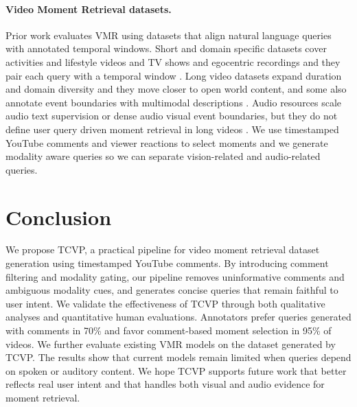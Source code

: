 \documentclass[11pt]{article}
\begin{document}
\paragraph{Video Moment Retrieval datasets.} Prior work evaluates VMR using datasets that align natural language queries with annotated temporal windows. Short and domain specific datasets cover activities and lifestyle videos and TV shows and egocentric recordings and they pair each query with a temporal window \cite{gao2017tall,QVHighlights,lei2020tvr,ego4d}.
Long video datasets expand duration and domain diversity and they move closer to open world content, and some also annotate event boundaries with multimodal descriptions \cite{momentseeker,longvale2025}.
Audio resources scale audio text supervision or dense audio visual event boundaries, but they do not define user query driven moment retrieval in long videos \cite{wavcaps,unav100}.
We use timestamped YouTube comments and viewer reactions to select moments and we generate modality aware queries so we can separate vision-related and audio-related queries.

\section{Conclusion}
We propose TCVP, a practical pipeline for video moment retrieval dataset generation using timestamped YouTube comments.
By introducing comment filtering and modality gating, our pipeline removes uninformative comments and ambiguous modality cues, and generates concise queries that remain faithful to user intent.
We validate the effectiveness of TCVP through both qualitative analyses and quantitative human evaluations. Annotators prefer queries generated with comments in 70\% and favor comment-based moment selection in 95\% of videos.
We further evaluate existing VMR models on the dataset generated by TCVP. The results show that current models remain limited when queries depend on spoken or auditory content.
We hope TCVP supports future work that better reflects real user intent and that handles both visual and audio evidence for moment retrieval.
\end{document}
